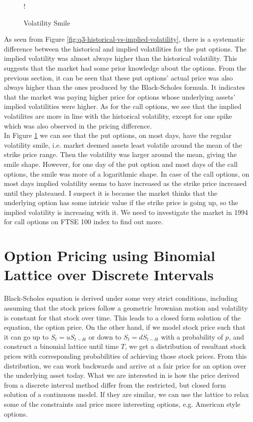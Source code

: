 \documentclass[11pt, fleqn]{article}
\begin{document}
\begin{figure}[!h]
   \centering 
   	\resizebox {0.6\textwidth} {!} { }
    \caption{Volatility Smile}
	\label{fig:q3-volatility-smile}
\end{figure}

As seen from Figure \ref{fig:q3-historical-vs-implied-volatility}, there is a systematic difference between the historical and implied volatilities for the put options. The implied volatility was almost always higher than the historical volatility. This suggests that the market had some prior knowledge about the options. From the previous section, it can be seen that these put options' actual price was also always higher than the ones produced by the Black-Scholes formula. It indicates that the market was paying higher price for options whose underlying assets' implied volatilities were higher. As for the call options, we see that the implied volatilites are more in line with the historical volatility, except for one spike which was also observed in the pricing difference.\\

In Figure \ref{fig:q3-volatility-smile} we can see that the put options, on most days, have the regular volatility smile, i.e. market deemed assets least volatile around the mean of the strike price range. Then the volatility was larger around the mean, giving the smile shape. However, for one day of the put option and most days of the call options, the smile was more of a logarithmic shape. In case of the call options, on most days implied volatility seems to have increased as the strike price increased until they plateaued. I suspect it is because the market thinks that the underlying option has some intrisic value if the strike price is going up, so the implied volatility is increasing with it. We need to investigate the market in 1994 for call options on FTSE 100 index to find out more.

\section{Option Pricing using Binomial Lattice over Discrete Intervals}

Black-Scholes equation is derived under some very strict conditions, including assuming that the stock prices follow a geometric brownian motion and volatility is constant for that stock over time. This leads to a closed form solution of the equation, the option price. On the other hand, if we model stock price such that it can go up to $S_t = uS_{t-\delta t}$ or down to $S_t = dS_{t-\delta t}$ with a probability of $p$, and construct a binomial lattice until time $T$, we get a distribution of resultant stock prices with corresponding probabilities of achieving those stock prices. From this distribution, we can work backwards and arrive at a fair price for an option over the underlying asset today. What we are interested in is how the price derived from a discrete interval method differ from the restricted, but closed form solution of a continuous model. If they are similar, we can use the lattice to relax some of the constraints and price more interesting options, e.g. American style options.
\end{document}
